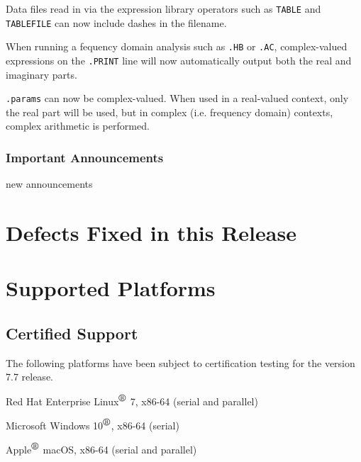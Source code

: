 \documentclass[letterpaper]{scrartcl}
\begin{document}
\begin{XyceItemize}
\item Data files read in via the expression library operators such as \texttt{TABLE} and \texttt{TABLEFILE} can now include dashes in the filename.

\item When running a fequency domain analysis such as \texttt{.HB} or \texttt{.AC}, complex-valued expressions on the \texttt{.PRINT} line will now automatically output both the real and imaginary parts.  

\item \texttt{.params} can now be complex-valued.  When used in a real-valued context, only the real part will be used, but in complex (i.e. frequency domain) contexts, complex arithmetic is performed.

\end{XyceItemize}

\subsubsection*{Important Announcements}
\begin{XyceItemize}
\item new announcements 
\end{XyceItemize}

\newpage
\section{Defects Fixed in this Release}


\newpage
\section{Supported Platforms}
\subsection*{Certified Support}
The following platforms have been subject to certification testing for the
\Xyce{} version 7.7 release.
\begin{XyceItemize}
  \item Red Hat Enterprise Linux${}^{\mbox{\textregistered}}$ 7, x86-64 (serial and parallel)
  \item Microsoft Windows 10${}^{\mbox{\textregistered}}$, x86-64 (serial)
  \item Apple${}^{\mbox{\textregistered}}$ macOS, x86-64 (serial and parallel)
\end{XyceItemize}
\end{document}
